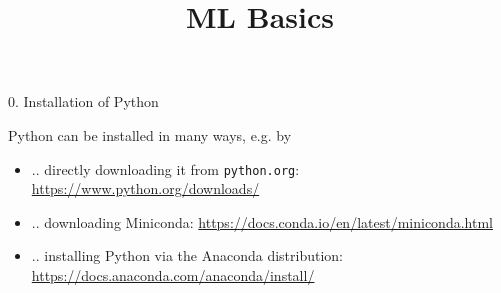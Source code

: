 



\newcommand{\titlefigure}{figure/python.png}
\newcommand{\learninggoals}{
\item Understand the different package management systems
\item Be comfortable in settig up a python environment
\item Know how to make your work reproducible with Python}

\title{ML Basics}
\date{}




\begin{vbframe}{0. Installation of Python}

\vfill

Python can be installed in many ways, e.g. by

	\begin{itemize}
		\item .. directly downloading it from \texttt{python.org}: \url{https://www.python.org/downloads/}
		\item .. downloading Miniconda: \url{https://docs.conda.io/en/latest/miniconda.html}
		\item .. installing Python via the Anaconda distribution: \url{https://docs.anaconda.com/anaconda/install/}
	\end{itemize}

\vfill

\end{vbframe}



